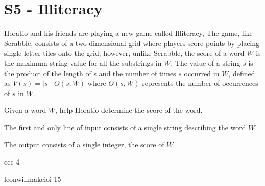 \section*{S5 - Illiteracy}
Horatio and his friends are playing a new game called Illiteracy, The game, like Scrabble, consists of a two-dimensional grid where players score points by placing single letter tiles onto the grid; however, unlike Scrabble, the score of a word $W$ is the maximum string value for all the substrings in $W$. The value of a string $s$ is the product of the length of s and the number of times $s$ occurred in $W$, defined as $V(s) = |s| \cdot O(s,W)$ where $O(s,W)$ represents the number of occurrences of $s$ in $W$.

Given a word $W$, help Horatio determine the score of the word.

The first and only line of input consists of a single string describing the word $W$.

\constraints
The output consists of a single integer, the score of $W$

\addsample
{
    ccc
}
{
    4
}

\addsample
{
    leonwillmakeioi
}
{
    15
}